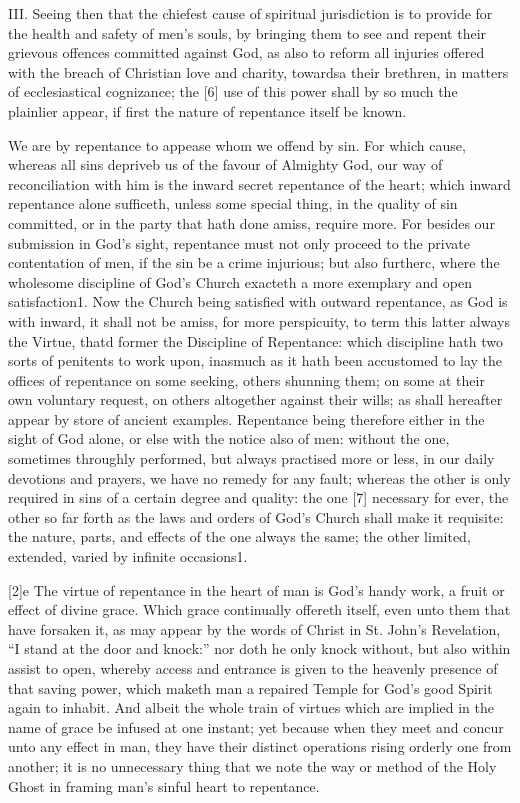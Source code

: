 III. Seeing then that the chiefest cause of spiritual jurisdiction is to provide for the health and safety of men’s souls, by bringing them to see and repent their grievous offences committed against God, as also to reform all injuries offered with the breach of Christian love and charity, towardsa their brethren, in matters of ecclesiastical cognizance; the [6] use of this power shall by so much the plainlier appear, if first the nature of repentance itself be known.

We are by repentance to appease whom we offend by sin. For which cause, whereas all sins depriveb us of the favour of Almighty God, our way of reconciliation with him is the inward secret repentance of the heart; which inward repentance alone sufficeth, unless some special thing, in the quality of sin committed, or in the party that hath done amiss, require more. For besides our submission in God’s sight, repentance must not only proceed to the private contentation of men, if the sin be a crime injurious; but also furtherc, where the wholesome discipline of God’s Church exacteth a more exemplary and open satisfaction1. Now the Church being satisfied with outward repentance, as God is with inward, it shall not be amiss, for more perspicuity, to term this latter always the Virtue, thatd former the Discipline of Repentance: which discipline hath two sorts of penitents to work upon, inasmuch as it hath been accustomed to lay the offices of repentance on some seeking, others shunning them; on some at their own voluntary request, on others altogether against their wills; as shall hereafter appear by store of ancient examples. Repentance being therefore either in the sight of God alone, or else with the notice also of men: without the one, sometimes throughly performed, but always practised more or less, in our daily devotions and prayers, we have no remedy for any fault; whereas the other is only required in sins of a certain degree and quality: the one [7] necessary for ever, the other so far forth as the laws and orders of God’s Church shall make it requisite: the nature, parts, and effects of the one always the same; the other limited, extended, varied by infinite occasions1.

[2]e The virtue of repentance in the heart of man is God’s handy work, a fruit or effect of divine grace. Which grace continually offereth itself, even unto them that have forsaken it, as may appear by the words of Christ in St. John’s Revelation, “I stand at the door and knock:” nor doth he only knock without, but also within assist to open, whereby access and entrance is given to the heavenly presence of that saving power, which maketh man a repaired Temple for God’s good Spirit again to inhabit. And albeit the whole train of virtues which are implied in the name of grace be infused at one instant; yet because when they meet and concur unto any effect in man, they have their distinct operations rising orderly one from another; it is no unnecessary thing that we note the way or method of the Holy Ghost in framing man’s sinful heart to repentance.

